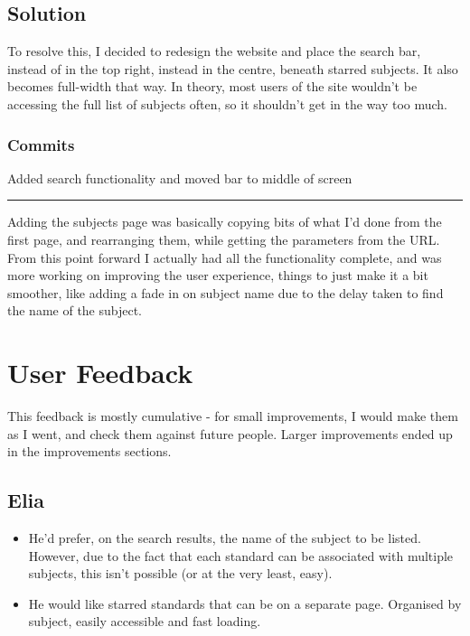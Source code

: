 \documentclass{article}
\begin{document}
\subsection*{Solution}
To resolve this, I decided to redesign the website and place the search bar, instead of in the top right, instead in the centre, beneath starred subjects. It also becomes full-width that way. In theory, most users of the site wouldn't be accessing the full list of subjects often, so it shouldn't get in the way too much.

\subsubsection*{Commits}
\begin{description}\small
    \item[\texttt{230e87e}]  Added search functionality and moved bar to middle of screen
\end{description}

\begin{center}
\rule{0.5\textwidth}{0.2pt}
\end{center}

Adding the subjects page was basically copying bits of what I'd done from the first page, and rearranging them, while getting the parameters from the URL. From this point forward I actually had all the functionality complete, and was more working on improving the user experience, things to just make it a bit smoother, like adding a fade in on subject name due to the delay taken to find the name of the subject.

\section{User Feedback}
This feedback is mostly cumulative - for small improvements, I would make them as I went, and check them against future people. Larger improvements ended up in the improvements sections.
\subsection*{Elia}
\begin{itemize}
    \item He'd prefer, on the search results, the name of the subject to be listed. However, due to the fact that each standard can be associated with multiple subjects, this isn't possible (or at the very least, easy). 
    \item He would like starred standards that can be on a separate page. Organised by subject, easily accessible and fast loading.
\end{itemize}
\end{document}
